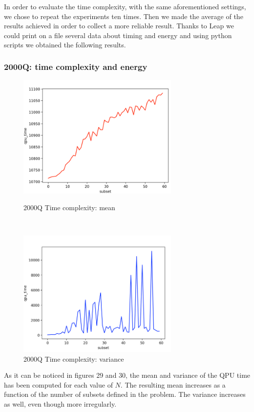\documentclass[oneside,a4paper]{article}
\begin{document}
\newpage
In order to evaluate the time complexity, with the same aforementioned settings, we chose to repeat the experiments ten times. Then we made the average of the results achieved in order to collect a more reliable result. Thanks to Leap we could print on a file several data about timing and energy and using python scripts we obtained the following results.

\subsubsection{2000Q: time complexity and energy}
\begin{figure}[htp]
\begin{minipage}[b]{7.5cm}
\centering
\includegraphics[width=8cm]{LaTeXTemplate/Images/2000QTimeComplexity.png}
\caption{2000Q Time complexity: mean}
\end{minipage}
\ \hspace{2mm} \hspace{2mm} \
\begin{minipage}[b]{9cm}
\centering
\includegraphics[width=8cm]{LaTeXTemplate/Images/2000QTimeVariance.png}
\caption{2000Q Time complexity: variance}
\end{minipage}
\end{figure}
As it can be noticed in figures 29 and 30, the mean and variance of the QPU time has been computed for each value of $N$. The resulting mean increases as a function of the number of subsets defined in the problem. The variance increases as well, even though more irregularly.
\end{document}
